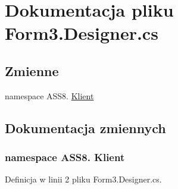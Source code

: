 \hypertarget{a00046}{
\section{Dokumentacja pliku Form3.Designer.cs}
\label{d3/dea/a00046}
}
\subsection*{Zmienne}
\begin{CompactItemize}
\item 
﻿namespace ASS8. \hyperlink{a00046_50d8d80fabd02a9a24fb725624e1ad24}{Klient}
\end{CompactItemize}


\subsection{Dokumentacja zmiennych}
\hypertarget{a00046_50d8d80fabd02a9a24fb725624e1ad24}{
\subsubsection[{Klient}]{\setlength{\rightskip}{0pt plus 5cm}﻿namespace ASS8. Klient}}
\label{d3/dea/a00046_50d8d80fabd02a9a24fb725624e1ad24}




Definicja w linii 2 pliku Form3.Designer.cs.